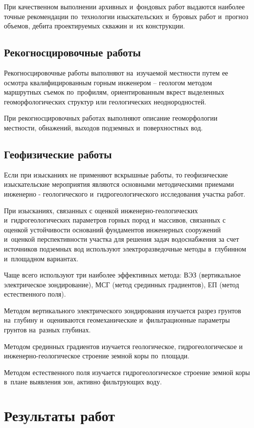 При качественном выполнении архивных и~фондовых работ выдаются наиболее точные рекомендации по~технологии изыскательских и~буровых работ и~прогноз объемов, дебита проектируемых скважин и~их конструкции.

\subsection{Рекогносцировочные работы}
Рекогносцировочные работы выполняют на~изучаемой местности путем ее осмотра квалифицированным горным инженером -- геологом методом маршрутных съемок по~профилям, ориентированным вкрест выделенных геоморфологических структур или геологических неоднородностей.

При рекогносцировочных работах выполняют описание геоморфологии местности, обнажений, выходов подземных и~поверхностных вод.

\subsection{Геофизические работы}
Если при изысканиях не применяют вскрышные работы, то геофизические изыскательские мероприятия являются основными методическими приемами инженерно - геологического и~гидрогеологического исследования участка работ.

При изысканиях, связанных с оценкой инженерно-геологических и~гидрогеологических параметров горных пород и~массивов, связанных с оценкой устойчивости оснований фундаментов инженерных сооружений и~оценкой перспективности участка для решения задач водоснабжения за счет источников подземных вод используют электроразведочные методы в~глубинном и~площадном вариантах.

Чаще всего используют три наиболее эффективных метода:  ВЭЗ (вертикальное электрическое зондирование), МСГ (метод срединных градиентов), ЕП (метод естественного поля).

Методом вертикального электрического зондирования изучается разрез грунтов на~глубину и~оцениваются геомеханические и~фильтрационные параметры грунтов на~разных глубинах.

Методом срединных градиентов изучается геологическое, гидрогеологическое и инженерно-геологическое строение земной коры по~площади.

Методом естественного поля изучается гидрогеологическое строение земной коры в~плане выявления зон, активно фильтрующих воду.

\section{Результаты работ}
